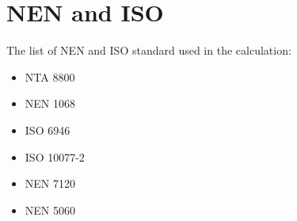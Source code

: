 \section{NEN and ISO}

The list of NEN and ISO standard used in the calculation:

\begin{itemize}
    \item NTA 8800
    \item NEN 1068
    \item ISO 6946
    \item ISO 10077-2
    \item NEN 7120
    \item NEN 5060\cite{NEN5060}
\end{itemize}

\newpage